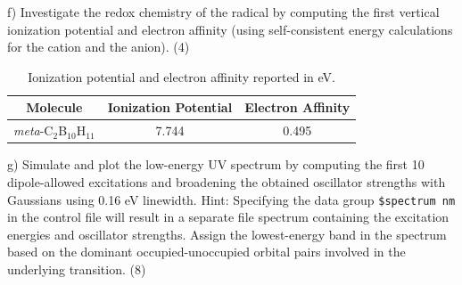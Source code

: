 \documentclass{article}
\begin{document}
\noindent f) Investigate the redox chemistry of the radical by computing
the first vertical ionization potential and electron affinity (using
self-consistent energy calculations for the cation and the anion). (4)
\\

\begin{table}[H]
  \centering
  \caption{Ionization potential and electron affinity
    reported in eV.}
  \begin{tabular}{ccc}
    Molecule & Ionization Potential & Electron Affinity \\
    \hline
    \textit{meta}-C$_2$B$_{10}$H$_{11}$ & 7.744 & 0.495 \\
  \end{tabular}
  \label{tab:ip_affinity}
\end{table}


\noindent g) Simulate and plot the low-energy UV spectrum by computing the
first 10 dipole-allowed excitations and broadening the obtained oscillator
strengths with Gaussians using 0.16 eV linewidth. Hint: Specifying the data
group \texttt{\$spectrum nm} in the control file will result in a separate file spectrum
containing the excitation energies and oscillator strengths. Assign the
lowest-energy band in the spectrum based on the dominant occupied-unoccupied
orbital pairs involved in the underlying transition. (8)
\\
\end{document}
